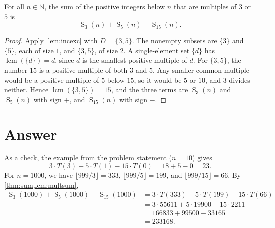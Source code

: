 \documentclass{article}
\begin{document}
\begin{theorem}\label{thm:sum}
  For all $n \in \mathbb{N}$, the sum of the positive integers below $n$ that are multiples of $3$ or $5$ is
  \[
    \operatorname{S}_3(n) + \operatorname{S}_5(n) - \operatorname{S}_{15}(n).
  \]
\end{theorem}
\begin{proof}
  Apply \cref{lem:incexc} with $D = \{3, 5\}$. The nonempty subsets are $\{3\}$ and $\{5\}$, each of size $1$, and
  $\{3, 5\}$, of size $2$. A single-element set $\{d\}$ has $\operatorname{lcm}(\{d\}) = d$, since $d$ is the smallest
  positive multiple of $d$. For $\{3, 5\}$, the number $15$ is a positive multiple of both $3$ and $5$. Any smaller
  common multiple would be a positive multiple of $5$ below $15$, so it would be $5$ or $10$, and $3$ divides neither.
  Hence $\operatorname{lcm}(\{3, 5\}) = 15$, and the three terms are $\operatorname{S}_3(n)$ and
  $\operatorname{S}_5(n)$ with sign $+$, and $\operatorname{S}_{15}(n)$ with sign $-$.
\end{proof}

\section*{Answer}
As a check, the example from the problem statement ($n = 10$) gives
\[
  3 \cdot T(3) + 5 \cdot T(1) - 15 \cdot T(0) = 18 + 5 - 0 = 23.
\]
For $n = 1000$, we have $\lfloor 999/3 \rfloor = 333$, $\lfloor 999/5 \rfloor = 199$, and $\lfloor 999/15 \rfloor = 66$.
By \cref{thm:sum,lem:multsum},
\begin{align*}
  \operatorname{S}_3(1000) + \operatorname{S}_5(1000) - \operatorname{S}_{15}(1000)
    &= 3 \cdot T(333) + 5 \cdot T(199) - 15 \cdot T(66) \\
    &= 3 \cdot 55611 + 5 \cdot 19900 - 15 \cdot 2211 \\
    &= 166833 + 99500 - 33165 \\
    &= 233168.
\end{align*}
\end{document}
